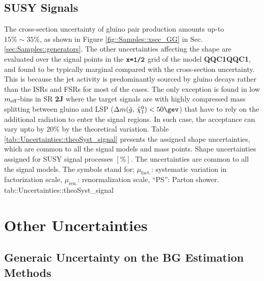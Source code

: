 \subsection{SUSY Signals} 
The cross-section uncertainty of gluino pair production amounts up-to $15\% \sim 35\%$, as shown in Figure \ref{fig::Samples::xsec_GG} in Sec. \ref{sec:Samples::generators}.
The other uncertainties affecting the shape are evaluated over the signal points in the $\mathrm{\textbf{\texttt{x=1/2}}}$ grid of the model \textbf{QQC1QQC1}, 
and found to be typically marginal compared with the cross-section uncertainty. This is because the jet activity is predominantly sourced by gluino decays rather than the ISRs and FSRs for most of the cases. 
The only exception is found in low $m_{\mathrm{eff}}$-bins in SR \textbf{2J} where the target signals are with highly compressed mass splitting between gluino and LSP ($\dmg < 50\gev$) that have to rely on the additional radiation to enter the signal regions. In such case, the acceptance can vary upto by $20\%$ by the theoretical variation. Table \ref{tab::Uncertainties::theoSyst_signal} presents the assigned shape uncertainties, which are common to all the signal models and mass points.
{Shape uncertainties assigned for SUSY signal processes $[\%]$. The uncertainties are common to all the signal models.
The symbols stand for; $\mu_{\mathrm{fact.}}$: systematic variation in factorization scale, $\mu_{\mathrm{ren.}}$: renormalization scale, ``PS'': Parton shower.}
{tab::Uncertainties::theoSyst_signal}


\clearpage
\section{Other Uncertainties} 
\subsection{Generaic Uncertainty on the BG Estimation Methods}  \label{sec::Uncertainties::nonClosure}

